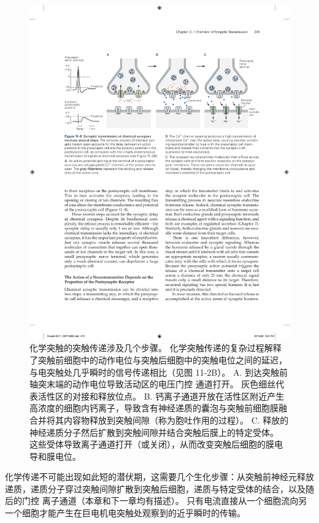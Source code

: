 \begin{figure}[htbp]
	\centering
	\includegraphics[width=0.95\linewidth]{chap11/fig_11_8}
	\caption{化学突触的突触传递涉及几个步骤。 化学突触传递的复杂过程解释了突触前细胞中的动作电位与突触后细胞中的突触电位之间的延迟，与电突触处几乎瞬时的信号传递相比（见图 11-2B）。 A. 到达突触前轴突末端的动作电位导致活动区的电压门控  通道打开。 灰色细丝代表活性区的对接和释放位点。 B. 钙离子通道开放在活性区附近产生高浓度的细胞内钙离子，导致含有神经递质的囊泡与突触前细胞膜融合并将其内容物释放到突触间隙（称为胞吐作用的过程）。 C. 释放的神经递质分子然后扩散到突触间隙并结合突触后膜上的特定受体。 这些受体导致离子通道打开（或关闭），从而改变突触后细胞的膜电导和膜电位。}
	\label{fig:11_8}
\end{figure}


化学传递不可能出现如此短的潜伏期，这需要几个生化步骤：从突触前神经元释放递质，递质分子穿过突触间隙扩散到突触后细胞，递质与特定受体的结合，以及随后的门控 离子通道（本章和下一章均有描述）。
只有电流直接从一个细胞流向另一个细胞才能产生在巨电机电突触处观察到的近乎瞬时的传输。


